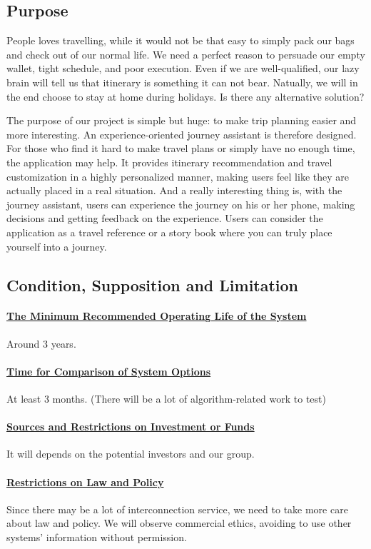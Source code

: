 \documentclass[10pt]{article}
\begin{document}
\subsection{Purpose}
People loves travelling, while it would not be that easy to simply pack our bags and check out of our normal life. We need a perfect reason to persuade our empty wallet, tight schedule, and poor execution. Even if we are well-qualified, our lazy brain will tell us that itinerary is something it can not bear. Natually, we will in the end choose to stay at home during holidays. Is there any alternative solution?

The purpose of our project is simple but huge: to make trip planning easier and more interesting. An experience-oriented journey assistant is therefore designed. For those who find it hard to make travel plans or simply have no enough time, the application may help. It provides itinerary recommendation and travel customization in a highly personalized manner, making users feel like they are actually placed in a real situation. And a really interesting thing is, with the journey assistant, users can experience the journey on his or her phone, making decisions and getting feedback on the experience. Users can consider the application as a travel reference or a story book where you can truly place yourself into a journey.

\subsection{Condition, Supposition and Limitation}
\paragraph{\underline{The Minimum Recommended Operating Life of the System}} 
Around 3 years.

\paragraph{\underline{Time for Comparison of System Options}}
At least 3 months. (There will be a lot of algorithm-related work to test)

\paragraph{\underline{Sources and Restrictions on Investment or Funds}}
It will depends on the potential investors and our group.

\paragraph{\underline{Restrictions on Law and Policy}}
Since there may be a lot of interconnection service, we need to take more care about law and policy. We will observe commercial ethics, avoiding to use other systems' information without permission.
\end{document}
